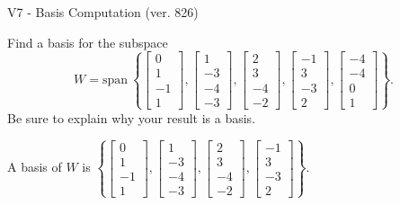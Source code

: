 \begin{exercise}
  \begin{exerciseTitle}V7 - Basis Computation (ver. 826)\end{exerciseTitle}
  \begin{exerciseStatement}
    Find a basis for the subspace 
\[W=\mathrm{span}\ \left\{\left[\begin{array}{r}
0 \\
1 \\
-1 \\
1
\end{array}\right] , \left[\begin{array}{r}
1 \\
-3 \\
-4 \\
-3
\end{array}\right] , \left[\begin{array}{r}
2 \\
3 \\
-4 \\
-2
\end{array}\right] , \left[\begin{array}{r}
-1 \\
3 \\
-3 \\
2
\end{array}\right] , \left[\begin{array}{r}
-4 \\
-4 \\
0 \\
1
\end{array}\right]\right\}.\]
 Be sure to explain why your result is a basis.


  \end{exerciseStatement}
  \begin{exerciseAnswer}
   A basis of \(W\) is  \(\left\{\left[\begin{array}{r}
0 \\
1 \\
-1 \\
1
\end{array}\right] , \left[\begin{array}{r}
1 \\
-3 \\
-4 \\
-3
\end{array}\right] , \left[\begin{array}{r}
2 \\
3 \\
-4 \\
-2
\end{array}\right] , \left[\begin{array}{r}
-1 \\
3 \\
-3 \\
2
\end{array}\right]\right\}\).
  


  \end{exerciseAnswer}
\end{exercise}